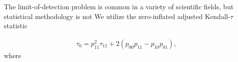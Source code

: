 \documentclass{article}
\begin{document}
The limit-of-detection problem is common in a variety of scientific fields, but statistical methodology is not 
We utilize the zero-inflated adjusted Kendall-$\tau$ statistic

\begin{align*}
    \tau_0 = p_{11}^2 \tau_11 + 2(p_{00} p_{11} - p_{10} p_{01}),
\end{align*}
where \citep{Pimentel2009KendallsTA, Albasi2018-iv}


























\end{document}
